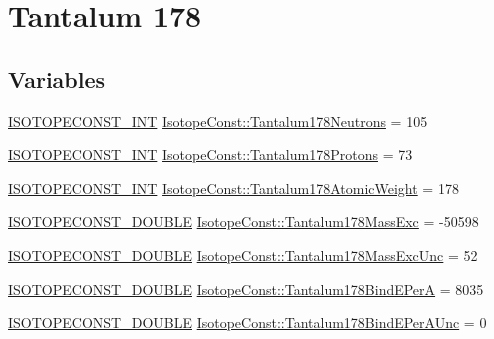 \hypertarget{group___isotope_const-_tantalum-_ta178}{}\section{Tantalum 178}
\label{group___isotope_const-_tantalum-_ta178}
\subsection*{Variables}
\begin{DoxyCompactItemize}
\item 
\mbox{\hyperlink{group___isotope_const-_macros_ga5f18360b3e99483a35c32d789e62621c}{I\+S\+O\+T\+O\+P\+E\+C\+O\+N\+S\+T\+\_\+\+I\+NT}} \mbox{\hyperlink{group___isotope_const-_tantalum-_ta178_ga43d188c80bc6eac532372fdaffdb566f}{Isotope\+Const\+::\+Tantalum178\+Neutrons}} = 105
\item 
\mbox{\hyperlink{group___isotope_const-_macros_ga5f18360b3e99483a35c32d789e62621c}{I\+S\+O\+T\+O\+P\+E\+C\+O\+N\+S\+T\+\_\+\+I\+NT}} \mbox{\hyperlink{group___isotope_const-_tantalum-_ta178_ga20d57778e7b02a63191a88cfc6d5d8ba}{Isotope\+Const\+::\+Tantalum178\+Protons}} = 73
\item 
\mbox{\hyperlink{group___isotope_const-_macros_ga5f18360b3e99483a35c32d789e62621c}{I\+S\+O\+T\+O\+P\+E\+C\+O\+N\+S\+T\+\_\+\+I\+NT}} \mbox{\hyperlink{group___isotope_const-_tantalum-_ta178_ga5ef445ad1ccf3763b2f77dbef2d937dc}{Isotope\+Const\+::\+Tantalum178\+Atomic\+Weight}} = 178
\item 
\mbox{\hyperlink{group___isotope_const-_macros_ga8f45a7272ce02c0b4c65c44636ed719a}{I\+S\+O\+T\+O\+P\+E\+C\+O\+N\+S\+T\+\_\+\+D\+O\+U\+B\+LE}} \mbox{\hyperlink{group___isotope_const-_tantalum-_ta178_gaaeffa711e3ee2188f94c8297fce5268d}{Isotope\+Const\+::\+Tantalum178\+Mass\+Exc}} = -\/50598
\item 
\mbox{\hyperlink{group___isotope_const-_macros_ga8f45a7272ce02c0b4c65c44636ed719a}{I\+S\+O\+T\+O\+P\+E\+C\+O\+N\+S\+T\+\_\+\+D\+O\+U\+B\+LE}} \mbox{\hyperlink{group___isotope_const-_tantalum-_ta178_ga1e7ac1c9254fa674962d4ad3fd439515}{Isotope\+Const\+::\+Tantalum178\+Mass\+Exc\+Unc}} = 52
\item 
\mbox{\hyperlink{group___isotope_const-_macros_ga8f45a7272ce02c0b4c65c44636ed719a}{I\+S\+O\+T\+O\+P\+E\+C\+O\+N\+S\+T\+\_\+\+D\+O\+U\+B\+LE}} \mbox{\hyperlink{group___isotope_const-_tantalum-_ta178_ga492472e3d39588d018c7ddb4604de3aa}{Isotope\+Const\+::\+Tantalum178\+Bind\+E\+PerA}} = 8035
\item 
\mbox{\hyperlink{group___isotope_const-_macros_ga8f45a7272ce02c0b4c65c44636ed719a}{I\+S\+O\+T\+O\+P\+E\+C\+O\+N\+S\+T\+\_\+\+D\+O\+U\+B\+LE}} \mbox{\hyperlink{group___isotope_const-_tantalum-_ta178_ga8a8ee1df8f7d9aa4a5302d11a99d7447}{Isotope\+Const\+::\+Tantalum178\+Bind\+E\+Per\+A\+Unc}} = 0

\end{DoxyCompactItemize}
